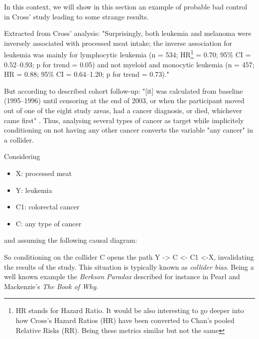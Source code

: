 \documentclass{article}
\begin{document}
In this context, we will show in this section an example of probable bad control in Cross' study leading to some strange results.

Extracted from Cross' analysis: "Surprisingly, both leukemia and melanoma were inversely associated with processed meat intake; the inverse association for leukemia was mainly for lymphocytic leukemia (n = 534; HR\footnote{HR stands for Hazard Ratio.
It would be also interesting to go deeper into how Cross's Hazard Ratios (HR) have been converted to Chan's pooled Relative Risks (RR). Being these metrics similar but not the same} = 0.70; 95\% CI = 0.52–0.93; p for trend = 0.05) and not myeloid and monocytic leukemia (n = 457; HR = 0.88; 95\% CI = 0.64–1.20; p for trend = 0.73)."\cite{cross}

But according to described cohort follow-up: "[it] was calculated from baseline (1995–1996) until censoring at the end of 2003, or when the participant moved out of one of the eight study areas, had a cancer diagnosis, or died, whichever came first" \cite{cross}. Thus, analysing several types of cancer as target while implicitely conditioning on not having any other cancer converts the variable "any cancer" in a collider.

Considering
\begin{itemize}
\item X: processed meat
\item Y: leukemia
\item C1: colorectal cancer
\item C: any type of cancer
\end{itemize}

and assuming the following causal diagram:


So conditioning on the collider C opens the path Y -> C <- C1 <-X, invalidating the results of the study. This situation is typically known as \textit{collider bias}. Being a well known example the \textit{Berkson Paradox} described for instance in Pearl and Mackenzie's \textit{The Book of Why}.\cite{bookofwhy}
\end{document}

